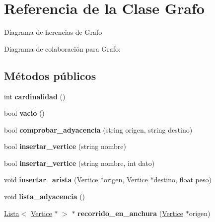\hypertarget{classGrafo}{}\section{Referencia de la Clase Grafo}
\label{classGrafo}


Diagrama de herencias de Grafo


Diagrama de colaboración para Grafo\+:
\subsection*{Métodos públicos}
\begin{DoxyCompactItemize}
\item 
\mbox{\label{classGrafo_acffb2ecb4e945a429ee650ef86c50828}} 
int {\bfseries cardinalidad} ()
\item 
\mbox{\label{classGrafo_a1b0368926f9523063c42373e7b85f71f}} 
bool {\bfseries vacio} ()
\item 
\mbox{\label{classGrafo_a7bfb0f93720820e9d0cb8091f32d69a7}} 
bool {\bfseries comprobar\+\_\+adyacencia} (string origen, string destino)
\item 
\mbox{\label{classGrafo_ade13f10eecc05a5a08ef43c26b53e248}} 
bool {\bfseries insertar\+\_\+vertice} (string nombre)
\item 
\mbox{\label{classGrafo_a45450097c4398a0539689245784adf4a}} 
bool {\bfseries insertar\+\_\+vertice} (string nombre, int dato)
\item 
\mbox{\label{classGrafo_ae49d7c6c60a6b5bb1a7e66ef72144d36}} 
void {\bfseries insertar\+\_\+arista} (\hyperlink{classVertice}{Vertice} $\ast$origen, \hyperlink{classVertice}{Vertice} $\ast$destino, float peso)
\item 
\mbox{\label{classGrafo_a3d18ac8c9af95b06e7e17671b4d17b3c}} 
void {\bfseries lista\+\_\+adyacencia} ()
\item 
\mbox{\label{classGrafo_a1c65e0f7cbbf74cd690b5eddf220728d}} 
\hyperlink{classLista}{Lista}$<$ \hyperlink{classVertice}{Vertice} $\ast$ $>$ $\ast$ {\bfseries recorrido\+\_\+en\+\_\+anchura} (\hyperlink{classVertice}{Vertice} $\ast$origen)

\end{DoxyCompactItemize}
